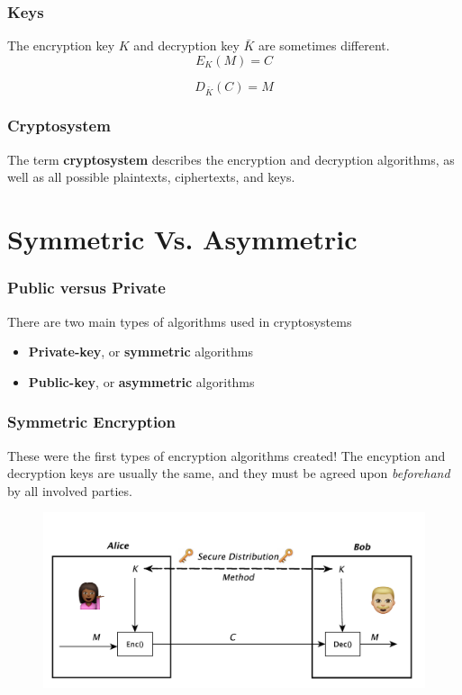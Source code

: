 \documentclass{beamer}
\newcommand{\<}{\langle}
\renewcommand{\>}{\rangle}
\begin{document}
\begin{frame}
\frametitle{Keys}

The encryption key $K$ and decryption key $\bar K$ are sometimes different.
\[
E_K(M) = C
\]

\[
D_{\bar{K}}(C) = M
\]
\end{frame}

\begin{frame}
\frametitle{Cryptosystem}

The term \textbf{cryptosystem} describes the encryption and decryption algorithms, as well as all possible plaintexts, ciphertexts, and keys. 
\end{frame}


\section{Symmetric Vs. Asymmetric} 


\begin{frame}
\frametitle{Public versus Private}

There are two main types of algorithms used in cryptosystems

\begin{itemize}
\item \textbf{Private-key}, or \textbf{symmetric} algorithms
\item \textbf{Public-key}, or \textbf{asymmetric} algorithms
\end{itemize}
\end{frame}



\begin{frame}
\frametitle{Symmetric Encryption}

These were the first types of encryption algorithms created! The encyption and decryption keys are usually the same, and they must be agreed upon \emph{beforehand} by all involved parties. 

\begin{figure}
\includegraphics[scale=.5]{IMG/diag9.pdf}
\end{figure}
\end{frame}
\end{document}
